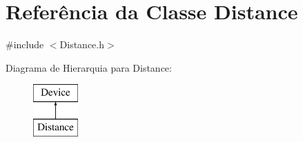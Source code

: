 \hypertarget{classDistance}{\section{Referência da Classe Distance}
\label{classDistance}
}


{\ttfamily \#include $<$Distance.\-h$>$}

Diagrama de Hierarquia para Distance\-:\begin{figure}[H]
\begin{center}
\leavevmode
\includegraphics[height=2.000000cm]{classDistance}
\end{center}
\end{figure}
